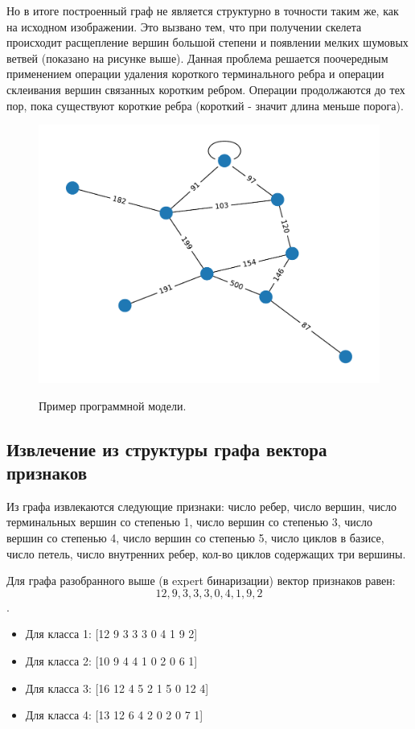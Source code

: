 \documentclass[10pt]{article}
\begin{document}
	Но в итоге построенный граф не является структурно в точности таким же, как на исходном изображении. Это вызвано тем, что при получении скелета происходит расщепление вершин большой степени и появлении мелких шумовых ветвей (показано на рисунке выше). Данная проблема решается поочередным применением операции удаления короткого терминального ребра и операции склеивания вершин связанных коротким ребром. Операции продолжаются до тех пор, пока существуют короткие ребра (короткий - значит длина меньше порога).
	
	
	\begin{figure}[h]
		\begin{center}
			{\includegraphics[width=0.5\linewidth]{data/graph_example.pdf}}
		\end{center}
		\caption{Пример программной модели.}
		\label{ris:image10}
	\end{figure}
	
	
	\subsection*{Извлечение из структуры графа вектора признаков}
	
	Из графа извлекаются следующие признаки: число ребер, число вершин, число терминальных вершин со степенью 1, число вершин со степенью 3, число вершин со степенью 4, число вершин со степенью 5, число циклов в базисе, число петель, число внутренних ребер, кол-во циклов содержащих три вершины.
	
	Для графа разобранного выше (в expert бинаризации) вектор признаков равен:\\
	\[12, 9, 3, 3, 3, 0, 4, 1, 9, 2\].
	
	\begin{itemize}
		\item Для класса 1: [12  9  3  3  3  0  4  1  9  2]
		\item Для класса 2: [10  9  4  4  1  0  2  0  6  1]
		\item Для класса 3: [16 12  4  5  2  1  5  0 12  4]
		\item Для класса 4: [13 12  6  4  2  0  2  0  7  1]
	\end{itemize}
	
\end{document}
